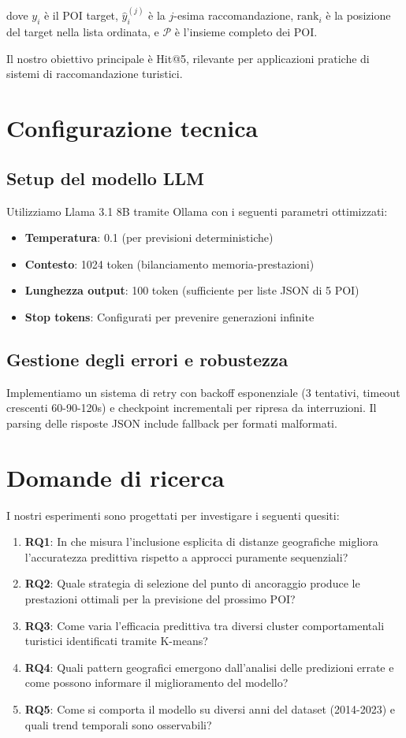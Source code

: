 dove $y_i$ è il POI target, $\hat{y}_i^{(j)}$ è la $j$-esima raccomandazione, $\text{rank}_i$ è la posizione del target nella lista ordinata, e $\mathcal{P}$ è l'insieme completo dei POI.

Il nostro obiettivo principale è Hit@5, rilevante per applicazioni pratiche di sistemi di raccomandazione turistici.

\section{Configurazione tecnica}

\subsection{Setup del modello LLM}
Utilizziamo Llama 3.1 8B tramite Ollama con i seguenti parametri ottimizzati:
\begin{itemize}
\item \textbf{Temperatura}: 0.1 (per previsioni deterministiche)
\item \textbf{Contesto}: 1024 token (bilanciamento memoria-prestazioni)
\item \textbf{Lunghezza output}: 100 token (sufficiente per liste JSON di 5 POI)
\item \textbf{Stop tokens}: Configurati per prevenire generazioni infinite
\end{itemize}

\subsection{Gestione degli errori e robustezza}
Implementiamo un sistema di retry con backoff esponenziale (3 tentativi, timeout crescenti 60-90-120s) e checkpoint incrementali per ripresa da interruzioni. Il parsing delle risposte JSON include fallback per formati malformati.

\section{Domande di ricerca}

I nostri esperimenti sono progettati per investigare i seguenti quesiti:

\begin{enumerate}
\item \textbf{RQ1}: In che misura l'inclusione esplicita di distanze geografiche migliora l'accuratezza predittiva rispetto a approcci puramente sequenziali?
\item \textbf{RQ2}: Quale strategia di selezione del punto di ancoraggio produce le prestazioni ottimali per la previsione del prossimo POI?
\item \textbf{RQ3}: Come varia l'efficacia predittiva tra diversi cluster comportamentali turistici identificati tramite K-means?
\item \textbf{RQ4}: Quali pattern geografici emergono dall'analisi delle predizioni errate e come possono informare il miglioramento del modello?
\item \textbf{RQ5}: Come si comporta il modello su diversi anni del dataset (2014-2023) e quali trend temporali sono osservabili?
\end{enumerate}

